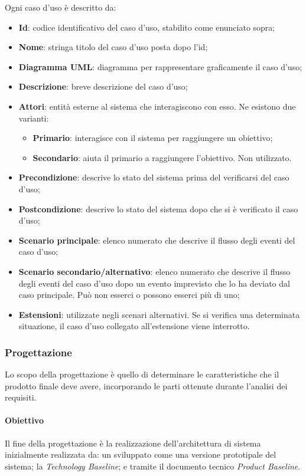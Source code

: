 Ogni caso d'uso è descritto da:
\begin{itemize}
\item \textbf{Id}: codice identificativo del caso d'uso, stabilito come enunciato sopra;
\item \textbf{Nome}: stringa titolo del caso d'uso posta dopo l'id;
\item \textbf{Diagramma UML}: diagramma per rappresentare graficamente il caso d'uso;
\item \textbf{Descrizione}: breve descrizione del caso d'uso;
\item \textbf{Attori}: entità esterne al sistema che interagiscono con esso. Ne esistono due varianti:
\begin{itemize}
\item \textbf{Primario}: interagisce con il sistema per raggiungere un obiettivo;
\item \textbf{Secondario}: aiuta il primario a raggiungere l'obiettivo. Non utilizzato.
\end{itemize}
\item \textbf{Precondizione}: descrive lo stato del sistema prima del verificarsi del caso d'uso;
\item \textbf{Postcondizione}: descrive lo stato del sistema dopo che si è verificato il caso d'uso;
\item \textbf{Scenario principale}: elenco numerato che descrive il flusso degli eventi del caso d'uso;
\item \textbf{Scenario secondario/alternativo}: elenco numerato che descrive il flusso degli eventi del caso d'uso dopo un evento imprevisto che lo ha deviato dal caso principale. Può non esserci o possono esserci più di uno;
\item \textbf{Estensioni}: utilizzate negli scenari alternativi. Se si verifica una determinata situazione, il caso d'uso collegato all'estensione viene interrotto.
\end{itemize}

\subsubsection{Progettazione}
Lo scopo della progettazione è quello di determinare le caratteristiche che il prodotto finale deve avere, incorporando le parti ottenute durante l'analisi dei requisiti.

\paragraph{Obiettivo}
Il fine della progettazione è la realizzazione dell'architettura di sistema inizialmente realizzata da: un \docNamePoC{}\glo{}  sviluppato come una versione prototipale del sistema; la  \textit{Technology Baseline}; e tramite il documento tecnico  \textit{Product Baseline}.


